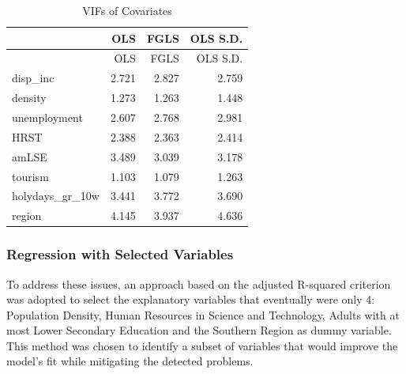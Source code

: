 \documentclass[
  letterpaper,
  DIV=11,
  numbers=noendperiod,
  abstract]{scrartcl}
\begin{document}
\begin{longtable}[]{@{}lrrr@{}}
\caption{VIFs of Covariates}\tabularnewline
\toprule\noalign{}
& OLS & FGLS & OLS S.D. \\
\midrule\noalign{}
\endfirsthead
\toprule\noalign{}
& OLS & FGLS & OLS S.D. \\
\midrule\noalign{}
\endhead
\bottomrule\noalign{}
\endlastfoot
disp\_inc & 2.721 & 2.827 & 2.759 \\
density & 1.273 & 1.263 & 1.448 \\
unemployment & 2.607 & 2.768 & 2.981 \\
HRST & 2.388 & 2.363 & 2.414 \\
amLSE & 3.489 & 3.039 & 3.178 \\
tourism & 1.103 & 1.079 & 1.263 \\
holydays\_gr\_10w & 3.441 & 3.772 & 3.690 \\
region & 4.145 & 3.937 & 4.636 \\
\end{longtable}

\subsubsection{Regression with Selected
Variables}\label{regression-with-selected-variables}

To address these issues, an approach based on the adjusted R-squared
criterion was adopted to select the explanatory variables that
eventually were only 4: Population Density, Human Resources in Science
and Technology, Adults with at most Lower Secondary Education and the
Southern Region as dummy variable. This method was chosen to identify a
subset of variables that would improve the model's fit while mitigating
the detected problems.
\end{document}
